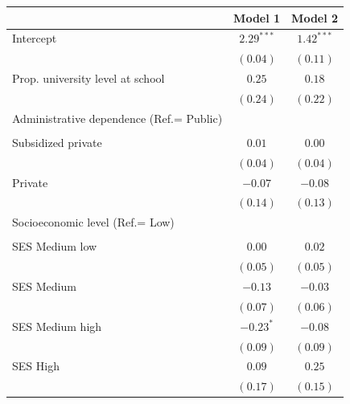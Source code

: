 \documentclass[
  letterpaper,
  DIV=11,
  numbers=noendperiod]{scrartcl}
\begin{document}
\hypertarget{tbl-contextual-reg}{}
\begin{table}
\begin{center}
\begin{tabular}{l c c}
\hline
 & Model 1 & Model 2 \\
\hline
Intercept                                & $2.29^{***}$  & $1.42^{***}$  \\
                                         & $(0.04)$      & $(0.11)$      \\
Prop. university level at school         & $0.25$        & $0.18$        \\
                                         & $(0.24)$      & $(0.22)$      \\
Administrative dependence (Ref.= Public) &               &               \\
                                         &               &               \\
\quad Subsidized private                 & $0.01$        & $0.00$        \\
                                         & $(0.04)$      & $(0.04)$      \\
\quad Private                            & $-0.07$       & $-0.08$       \\
                                         & $(0.14)$      & $(0.13)$      \\
Socioeconomic level (Ref.= Low)          &               &               \\
                                         &               &               \\
\quad SES Medium low                     & $0.00$        & $0.02$        \\
                                         & $(0.05)$      & $(0.05)$      \\
\quad SES Medium                         & $-0.13$       & $-0.03$       \\
                                         & $(0.07)$      & $(0.06)$      \\
\quad SES Medium high                    & $-0.23^{*}$   & $-0.08$       \\
                                         & $(0.09)$      & $(0.09)$      \\
\quad SES High                           & $0.09$        & $0.25$        \\
                                         & $(0.17)$      & $(0.15)$      \\

\end{tabular}
\end{center}
\end{table}
\end{document}
